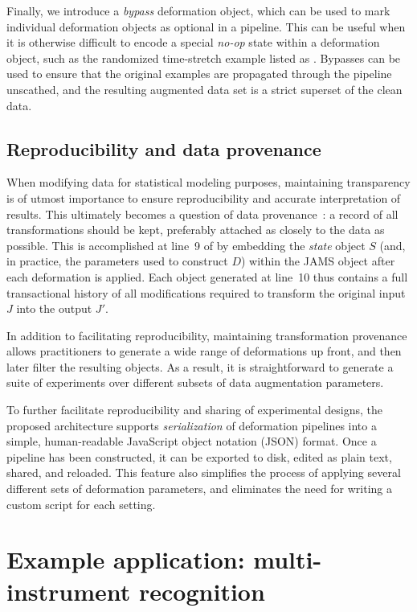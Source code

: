 \documentclass{article}
\begin{document}
Finally, we introduce a \emph{bypass} deformation object, which can be used to mark
individual deformation objects as optional in a pipeline.  This can be useful when it is
otherwise difficult to encode a special \emph{no-op} state within a deformation object, 
such as the randomized time-stretch example listed as .  Bypasses 
can be used to ensure that the original examples are propagated through the 
pipeline unscathed, and the resulting augmented data set is a strict superset of the
clean data.

\subsection{Reproducibility and data provenance}
\label{sec:reproducibility}
When modifying data for statistical modeling purposes, maintaining transparency is of
utmost importance to ensure reproducibility and accurate interpretation of results.
This ultimately becomes a question of data provenance~\cite{buneman2000data}: a record of
all transformations should be kept, preferably attached as closely to the data as
possible.  This is accomplished at line~9 of  by embedding the 
\emph{state} object $S$ (and, in practice, the parameters used to construct $D$) within the JAMS object after each deformation is applied.  
Each object generated at line~10 thus contains a full transactional history of all
modifications required to transform the original input $J$ into the output $J'$.

In addition to facilitating reproducibility, maintaining transformation provenance allows
practitioners to generate a wide range of deformations up front, and then later filter the
resulting objects.  As a result, it is straightforward to generate a suite of experiments
over different subsets of data augmentation parameters.

To further facilitate reproducibility and sharing of experimental designs, the proposed
architecture supports \emph{serialization} of deformation pipelines into a simple,
human-readable JavaScript object notation (JSON) format.
Once a pipeline has been constructed, it can be exported to
disk, edited as plain text, shared, and reloaded.  This feature also simplifies the
process of applying several different sets of deformation parameters, and eliminates the
need for writing a custom script for each setting.

\section{Example application: multi-instrument recognition}
\end{document}
